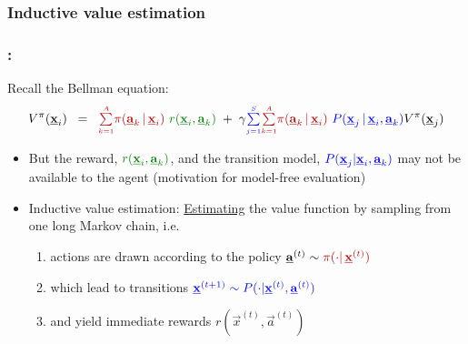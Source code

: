 \subsubsection{Inductive value estimation}

\begin{frame}\frametitle{\subsecname:~\subsubsecname}

	Recall the Bellman equation:
	\begin{equation}
			V^\pi(\vec x_i) \;\;=\;\;
				{\color{policy} \smallsum{k=1}A 
					\pi(\vec a_k \,|\, \vec x_i)}~ 
					{\color{reward} r(\vec x_i, \vec a_k)}
				\;+\; \gamma {\color{trans} \smallsum{j=1}{S}}
					{\color{policy} \smallsum{k=1}A 
					\pi(\vec a_k \,|\, \vec x_i)}~
					{\color{trans} P(\vec x_j \,|\, \vec x_i, \vec a_k)} V^\pi(\vec x_j)
	\end{equation}
		
	\begin{itemize}
		\item But the reward, ${\color{reward} r(\vec x_i, \vec a_k)}$, and the transition model, ${\color{trans}P(\vec  x_j | \vec  x_i, \vec  a_k)}$
		 may not be available to the agent (motivation for model-free evaluation)
		 
		 \pause
		 
		 \slidesonly{\vspace{5mm}}
		 
		\item Inductive value estimation: \underline{Estimating} the value function by sampling from one long Markov chain, i.e.
			\begin{enumerate}
				\item actions are drawn according to the {\color{policy}policy} 
				$ \vec a^{(t)} \sim {\color{policy}\pi(\cdot|\, \vec x^{(t)})}$
				
				\item which lead to {\color{trans}transitions} 
					${\color{trans}\vec x^{(t+1)}
					\sim P(\cdot|\vec x^{(t)},\vec a^{(t)})}$
					
				\item and yield immediate {\color{reward} rewards 
					$r(\vec x^{(t)},\vec a^{(t)})$}
			\end{enumerate}
	\end{itemize}
	
\end{frame}


